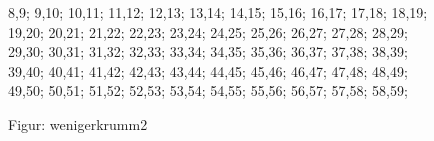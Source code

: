 \documentclass[a4paper,10pt,ngerman]{scrartcl}
\begin{document}
\begin{figure}[!h]
{            8,9;
            9,10;
            10,11;
            11,12;
            12,13;
            13,14;
            14,15;
            15,16;
            16,17;
            17,18;
            18,19;
            19,20;
            20,21;
            21,22;
            22,23;
            23,24;
            24,25;
            25,26;
            26,27;
            27,28;
            28,29;
            29,30;
            30,31;
            31,32;
            32,33;
            33,34;
            34,35;
            35,36;
            36,37;
            37,38;
            38,39;
            39,40;
            40,41;
            41,42;
            42,43;
            43,44;
            44,45;
            45,46;
            46,47;
            47,48;
            48,49;
            49,50;
            50,51;
            51,52;
            52,53;
            53,54;
            54,55;
            55,56;
            56,57;
            57,58;
            58,59;
        }
        \caption{Figur: wenigerkrumm2}
        \label{fig:wenigerkrumm2}
    \end{figure}
    \newpage
\end{document}
